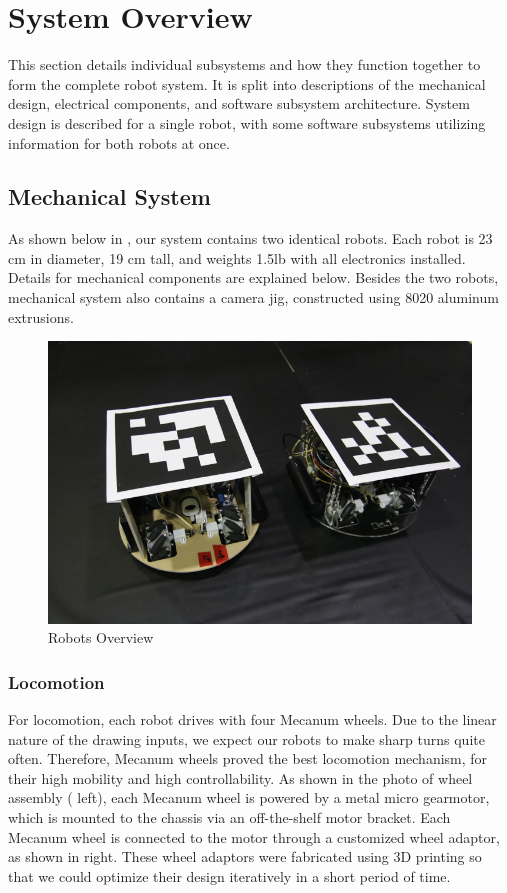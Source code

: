 \section{System Overview}
\label{sec:system_overview}

This section details individual subsystems and how they function together to form the complete robot system. It is split into descriptions of the mechanical design, electrical components, and software subsystem architecture. System design is described for a single robot, with some software subsystems utilizing information for both robots at once.

\subsection{Mechanical System}
\label{sec:mechanical}
As shown below in , our system contains two identical robots. Each robot is 23 cm in diameter, 19 cm tall, and weights 1.5lb with all electronics installed. Details for mechanical components are explained below. Besides the two robots, mechanical system also contains a camera jig, constructed using 8020 aluminum extrusions.

\begin{figure}[h!]
\centering
\includegraphics[width=0.98\columnwidth]{figs/full_system.png}
\caption{Robots Overview}
\label{fig:so1}
\end{figure}

\subsubsection{Locomotion}
\label{sec:me_locomotion}
For locomotion, each robot drives with four Mecanum wheels. Due to the linear nature of the drawing inputs, we expect our robots to make sharp turns quite often. Therefore, Mecanum wheels proved the best locomotion mechanism, for their high mobility and high controllability. As shown in the photo of wheel assembly ( left), each Mecanum wheel is powered by a metal micro gearmotor, which is mounted to the chassis via an off-the-shelf motor bracket. Each Mecanum wheel is connected to the motor through a customized wheel adaptor, as shown in  right. These wheel adaptors were fabricated using 3D printing so that we could optimize their design iteratively in a short period of time.

